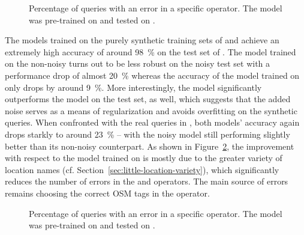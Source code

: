 \begin{figure}[h]
  \centering
  \resizebox{\textwidth}{!}{}
  \caption[Errors pre-trained on \nlmtwoone{}]{Percentage of queries with an
    error in a specific operator. The model was pre-trained on \nlmapstwoone{}
    and tested on \nlmapsfour{}.}
  \label{fig:v21-errors}
\end{figure}

The models trained on the purely synthetic training sets of \nlmthreea{} and
\nlmthreeb{} achieve an extremely high accuracy of around \SI{98}{\%} on the
test set of \nlmthreea{}. The model trained on the non-noisy \nlmthreea{} turns
out to be less robust on the noisy \nlmthreeb{} test set with a performance drop
of almost \SI{20}{\%} whereas the accuracy of the model trained on \nlmthreeb{}
only drops by around \SI{9}{\%}. More interestingly, the \nlmthreeb{} model
significantly outperforms the \nlmthreea{} model on the \nlmtwoone{} test set,
as well, which suggests that the added noise serves as a means of regularization
and avoids overfitting on the synthetic queries. When confronted with the real
queries in \nlmapsfour{}, both models’ accuracy again drops starkly to around
\SI{23}{\%} – with the noisy model still performing slightly better than its
non-noisy counterpart. As shown in Figure~\ref{fig:v3b-errors}, the improvement
with respect to the model trained on \nlmtwoone{} is mostly due to the greater
variety of location names (cf. Section~\ref{sec:little-location-variety}), which
significantly reduces the number of errors in the  and
 operators. The main source of errors remains choosing the
correct OSM tags in the  operator.

\begin{figure}[h]
  \centering
  \resizebox{\textwidth}{!}{}
  \caption[Errors pre-trained on \nlmtwoone{}]{Percentage of queries with an
    error in a specific operator. The model was pre-trained on \nlmapsthreeb{}
    and tested on \nlmapsfour{}.}
  \label{fig:v3b-errors}
\end{figure}

